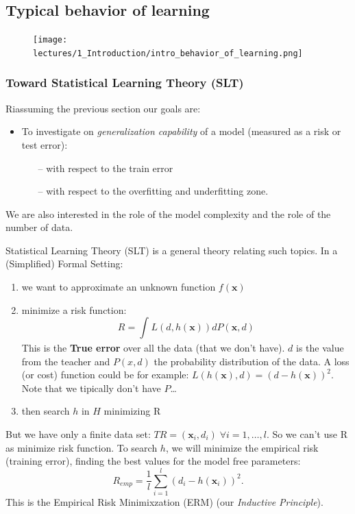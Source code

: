 \documentclass[../main.tex]{subfiles}
\begin{document}
\subsection*{Typical behavior of learning}
\begin{figure}[ht]
    \centering
    \texttt{[image: lectures/1\_Introduction/intro\_behavior\_of\_learning.png]}
\end{figure}

\subsubsection{Toward Statistical Learning Theory (SLT)}
Riassuming the previous section our goals are:
\begin{itemize}
    \item To investigate on \textit{generalization capability} of a model (measured as a risk or test error):
    \begin{itemize}
	\item[--] with respect to the train error
	\item[--] with respect to the overfitting and underfitting zone.
    \end{itemize}
\end{itemize}
We are also interested in the role of the model complexity and the role of the number of data.

Statistical Learning Theory (SLT) is a general theory relating such topics. In a (Simplified) Formal Setting:
\begin{enumerate}
    \item we want to approximate an unknown function $f(\mathbf{x})$
    
    \item  minimize a risk function:
    $$  R = \int_{}^{} L(d, h(\mathbf{x}))dP(\mathbf{x},d)$$
    This is the \textbf{True error} over all the data (that we don't have). $d$ is the value from the teacher and $P(x,d)$ the probability distribution of the data. A loss (or cost) function could be for example: $L(h(\mathbf{x}),d) = (d - h(\mathbf{x}))^2$.\\
    Note that we tipically don't have $P$\ldots
    \item then search $h$ in $H$ minimizing R
\end{enumerate}
But we have only a finite data set: $TR = (\mathbf{x}_i,d_i) \; \forall i = 1, \dots, l$. So we can't use R as minimize risk function. To search $h$, we will minimize the empirical risk (training error), finding the best values for the model free parameters:
\[
    R_{emp} = \frac{1}{l} \sum_{i = 1}^{l}(d_i - h(\mathbf{x}_i))^2
.\] 
This is the Empirical Risk Minimixzation (ERM) (our \textit{Inductive Principle}).
\end{document}
